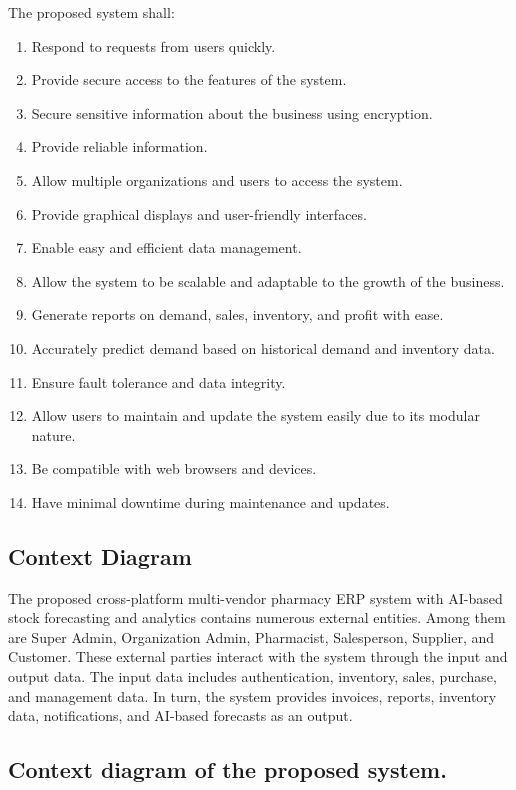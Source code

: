 \noindent The proposed system shall:
\begin{enumerate}
    \setlength{\itemsep}{0pt}
    \setlength{\parsep}{0pt}
    \setlength{\topsep}{0pt} 
    \item Respond to requests from users quickly.
    \item Provide secure access to the features of the system.
    \item Secure sensitive information about the business using encryption.
    \item Provide reliable information.
    \item Allow multiple organizations and users to access the system.
    \item Provide graphical displays and user-friendly interfaces.
    \item Enable easy and efficient data management.
    \item Allow the system to be scalable and adaptable to the growth of the business.
    \item Generate reports on demand, sales, inventory, and profit with ease.
    \item Accurately predict demand based on historical demand and inventory data.
    \item Ensure fault tolerance and data integrity.
    \item Allow users to maintain and update the system easily due to its modular nature.
    \item Be compatible with web browsers and devices.
    \item Have minimal downtime during maintenance and updates.
\end{enumerate}

\subsection{Context Diagram}
The proposed cross-platform multi-vendor pharmacy ERP system with AI-based stock forecasting and analytics contains numerous external entities. Among them are Super Admin, Organization Admin, Pharmacist, Salesperson, Supplier, and Customer. These external parties interact with the system through the input and output data. The input data includes authentication, inventory, sales, purchase, and management data. In turn, the system provides invoices, reports, inventory data, notifications, and AI-based forecasts as an output.

\subsection*{Context diagram of the proposed system.}


